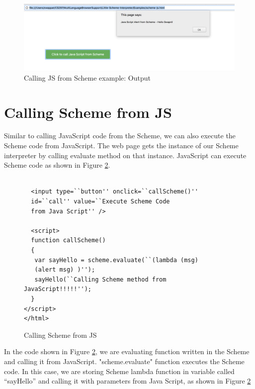 \begin{figure}[H]
	\begin{center}
		\includegraphics[width=\linewidth]{./images/scheme-js-interaction.png}
	\end{center}
	\caption{Calling JS from Scheme example: Output}
	\label{fig:scheme-js-interaction}
\end{figure}


\section{Calling Scheme from JS}

Similar to calling JavaScript code from the Scheme, we can also execute the Scheme code from JavaScript. The web page gets the instance of our Scheme interpreter by calling evaluate method on that instance. JavaScript can execute Scheme code as shown in Figure \ref{fig:js-scheme-interaction}. 


\begin{figure}[H]
	\begin{lstlisting}
	
  <input type=``button'' onclick=``callScheme()'' 
  id=``call'' value=``Execute Scheme Code 
  from Java Script'' />

  <script>
  function callScheme()
  {
   var sayHello = scheme.evaluate(``(lambda (msg)  
   (alert msg) )'');
   sayHello(``Calling Scheme method from JavaScript!!!!!'');
  }
</script>
</html>
	\end{lstlisting}
	\caption{Calling Scheme from JS}
	\label{fig:js-scheme-interaction}
\end{figure}



In the code shown in Figure \ref{fig:js-scheme-interaction}, we are evaluating function written in the Scheme and calling it from JavaScript. "scheme.evaluate" function executes the Scheme code. In this case, we are storing Scheme lambda function in variable called ``sayHello'' and calling it with parameters from Java Script, as shown in Figure \ref{fig:js-scheme-interaction}

